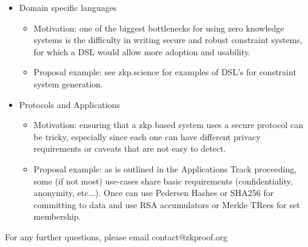 \documentclass{article}
\begin{document}
\begin{itemize}
\begin{itemize}
        \end{itemize}
    \item Domain specific languages
        \begin{itemize}
        	\item Motivation: one of the biggest bottlenecks for using zero knowledge systems is the difficulty in writing secure and robust constraint systems, for which a DSL would allow more adoption and usability.
        	\item Proposal example: see zkp.science for examples of DSL's for constraint system generation.
        \end{itemize}
    \item Protocols and Applications
        \begin{itemize}
        	\item Motivation: ensuring that a zkp based system uses a secure protocol can be tricky, especially since each one can have different privacy requirements or caveats that are not easy to detect.
        	\item Proposal example: as is outlined in the Applications Track proceeding, some (if not most) use-cases share basic requirements (confidentiality, anonymity, etc...). Once can use Pedersen Hashes or SHA256 for committing to data and use RSA accumulators or Merkle TRees for set membership.
    \end{itemize}
\end{itemize}

For any further questions, please email contact@zkproof.org
\end{document}
